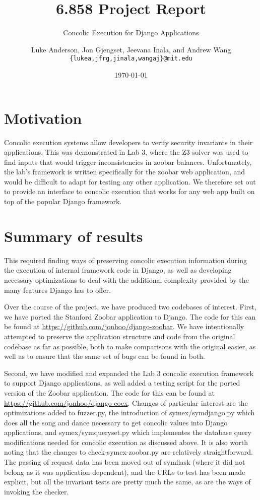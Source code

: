 \documentclass{scrartcl}
\author{
Luke Anderson, Jon Gjengset, Jeevana Inala, and Andrew Wang \\
\texttt{\{lukea,jfrg,jinala,wangaj\}@mit.edu}
}
\title{6.858 Project Report}
\subtitle{Concolic Execution for Django Applications}
\date{\today}
\begin{document}
\maketitle


\section{Motivation}

Concolic execution systems allow developers to verify security
invariants in their applications. This was demonstrated in Lab 3, where
the Z3 solver was used to find inputs that would trigger inconsistencies
in zoobar balances. Unfortunately, the lab's framework is written
specifically for the zoobar web application, and would be difficult to
adapt for testing any other application. We therefore set out to provide
an interface to concolic execution that works for any web app built on top
of the popular Django framework.


\section{Summary of results}

This required finding ways of preserving concolic execution information during
the execution of internal framework code in Django, as well as developing
necessary optimizations to deal with the additional complexity provided by the
many features Django has to offer.

Over the course of the project, we have produced two codebases of interest.
First, we have ported the Stanford Zoobar application to Django. The code for
this can be found at \url{https://github.com/jonhoo/django-zoobar}. We have
intentionally attempted to preserve the application structure and code from the
original codebase as far as possible, both to make comparisons with the
original easier, as well as to ensure that the same set of bugs can be found in
both.

Second, we have modified and expanded the Lab 3 concolic execution framework to
support Django applications, as well added a testing script for the ported
version of the Zoobar application. The code for this can be found at
\url{https://github.com/jonhoo/django-coex}. Changes of particular interest are
the optimizations added to fuzzer.py, the introduction of symex/symdjango.py
which does all the song and dance necessary to get concolic values into Django
applications, and symex/symqueryset.py which implementes the database query
modifications needed for concolic execution as discussed above. It is also
worth noting that the changes to check-symex-zoobar.py are relatively
straightforward. The passing of request data has been moved out of symflask
(where it did not belong as it was application-dependent), and the URLs to test
has been made explicit, but all the invariant tests are pretty much the same,
as are the ways of invoking the checker.
\end{document}
